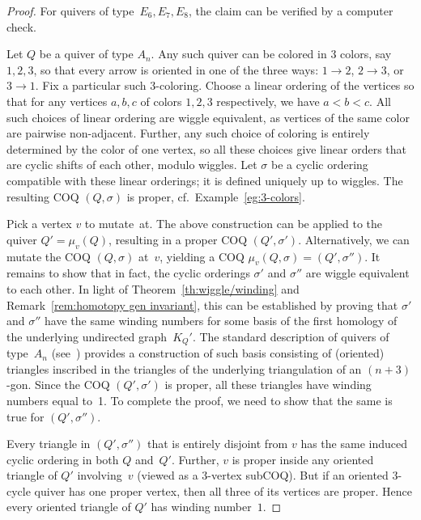 \documentclass[11pt, letterpaper]{amsart}
\theoremstyle{definition}
\numberwithin{equation}{section}
\def\wind{{\operatorname{wind}}}
\newcommand\GQ{K_Q}
\begin{document}
\begin{proof} 

For quivers of type~$E_6, E_7, E_8$, the claim can be verified by a computer check. 

Let $Q$ be a quiver of type $A_n$. %
Any such quiver can be colored in $3$ colors, say $1,2,3$, so that every arrow is oriented 
in one of the three ways: $1 \rightarrow 2$, $2 \rightarrow 3$, or $3 \rightarrow 1$.
Fix a particular such $3$-coloring. 
Choose a linear ordering of the vertices so that for any vertices $a,b,c$ of colors $1,2,3$ respectively, we have $a < b < c$.
All such choices of linear ordering are wiggle equivalent, as vertices of the same color are pairwise non-adjacent.
Further, any such choice of coloring is entirely determined by the color of one vertex, 
so all these choices give linear orders that are cyclic shifts of each other, modulo wiggles.
Let $\sigma$ be a cyclic ordering compatible with these linear orderings;
it is defined uniquely up to wiggles. 
The resulting COQ $(Q, \sigma)$ is proper, cf.\ Example~\ref{eg:3-colors}.

Pick a vertex $v$ to mutate~at. The above construction can be applied to the quiver $Q'=\mu_v(Q)$,
resulting in a proper COQ $(Q',\sigma')$. 
Alternatively, we can mutate the COQ $(Q, \sigma)$ at~$v$, yielding a COQ $\mu_v(Q,\sigma)=(Q',\sigma'')$. 
It remains to show that in fact, the cyclic orderings $\sigma'$ and $\sigma''$ are wiggle equivalent to each other. 
In light of Theorem~\ref{th:wiggle/winding} and Remark~\ref{rem:homotopy gen invariant}, 
this can be established by proving that $\sigma'$ and $\sigma''$ have the same winding numbers
for some basis of the first homology of the underlying undirected graph~$\GQ'$. 
The standard description of quivers of type~$A_n$ (see~\cite{ca2})
provides a construction of such basis consisting of (oriented) triangles inscribed in the triangles
of the underlying triangulation of an $(n+3)$-gon. 
Since the COQ $(Q',\sigma')$ is proper, all these triangles have winding numbers equal to~1. 
To complete the proof, we need to show that the same is true for $(Q',\sigma'')$. 

Every triangle in $(Q',\sigma'')$ that is entirely disjoint from $v$ has the same induced cyclic ordering in both $Q$ and~$Q'$.
Further, $v$ is proper inside any oriented triangle of $Q'$ involving~$v$ (viewed as a 3-vertex subCOQ). 
But if an oriented $3$-cycle quiver has one proper vertex, then all three of its vertices are proper.
Hence every oriented triangle of $Q'$ has winding number~$1$.


\end{proof}
\end{document}
